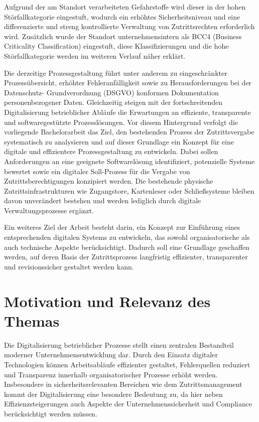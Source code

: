 \documentclass[
  12pt,
  a4paper,
  oneside,
  headings=normal,
  numbers=noendperiod
]{scrreprt}
\numberwithin{equation}{chapter}
\begin{document}
Aufgrund der am Standort verarbeiteten Gefahrstoffe wird dieser in der hohen
Störfallkategorie eingestuft, wodurch ein erhöhtes Sicherheitsniveau und eine
differenzierte und streng kontrollierte Verwaltung von Zutrittsrechten
erforderlich wird. Zusätzlich wurde der Standort unternehmensintern als BCC4
(Business Criticality Classification) eingestuft, diese Klassifizierungen und
die hohe Störfallkategorie werden im weiteren Verlauf näher erklärt.

Die derzeitige Prozessgestaltung führt unter anderem zu eingeschränkter
Prozessübersicht, erhöhter Fehleranfälligkeit sowie zu Herausforderungen bei der
Daten\-schutz- Grundverordnung (DSGVO) konformen Dokumentation personenbezogener
Daten. Gleichzeitig steigen mit der fortschreitenden Digitalisierung
betrieblicher Abläufe die Erwartungen an effiziente, transparente und
softwaregestützte Prozesslösungen. Vor diesem Hintergrund verfolgt die
vorliegende Bachelorarbeit das Ziel, den bestehenden Prozess der
Zutrittsvergabe systematisch zu analysieren und auf dieser Grundlage ein Konzept
für eine digitale und effizientere Prozessgestaltung zu entwickeln. Dabei sollen
Anforderungen an eine geeignete Softwarelösung identifiziert, potenzielle
Systeme bewertet sowie ein digitaler Soll-Prozess für die Vergabe von
Zutrittsberechtigungen konzipiert werden. Die bestehende physische
Zutrittsinfrastrukturen wie Zugangstore, Kartenleser oder Schließsysteme bleiben
davon unverändert bestehen und werden lediglich durch digitale
Verwaltungsprozesse ergänzt.

Ein weiteres Ziel der Arbeit besteht darin, ein Konzept zur Einführung eines
entsprechenden digitalen Systems zu entwickeln, das sowohl organisatorische als
auch technische Aspekte berücksichtigt. Dadurch soll eine Grundlage geschaffen
werden, auf deren Basis der Zutrittsprozess langfristig effizienter, transparenter
und revisionssicher gestaltet werden kann.

\section{Motivation und Relevanz des Themas}

Die Digitalisierung betrieblicher Prozesse stellt einen zentralen Bestandteil
moderner Unternehmensentwicklung dar. Durch den Einsatz digitaler Technologien
können Arbeitsabläufe effizienter gestaltet, Fehlerquellen reduziert und
Transparenz innerhalb organisatorischer Prozesse erhöht werden. Insbesondere in
sicherheitsrelevanten Bereichen wie dem Zutrittsmanagement kommt der
Digitalisierung eine besondere Bedeutung zu, da hier neben Effizienzsteigerungen
auch Aspekte der Unternehmenssicherheit und Compliance berücksichtigt werden
müssen.
\end{document}
